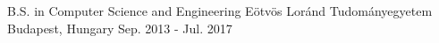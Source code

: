 

\begin{cventries}

  \cventry
    {B.S. in Computer Science and Engineering} %
    {Eötvös Loránd Tudományegyetem} %
    {Budapest, Hungary} %
    {Sep. 2013 - Jul. 2017} %
    {}

\end{cventries}
